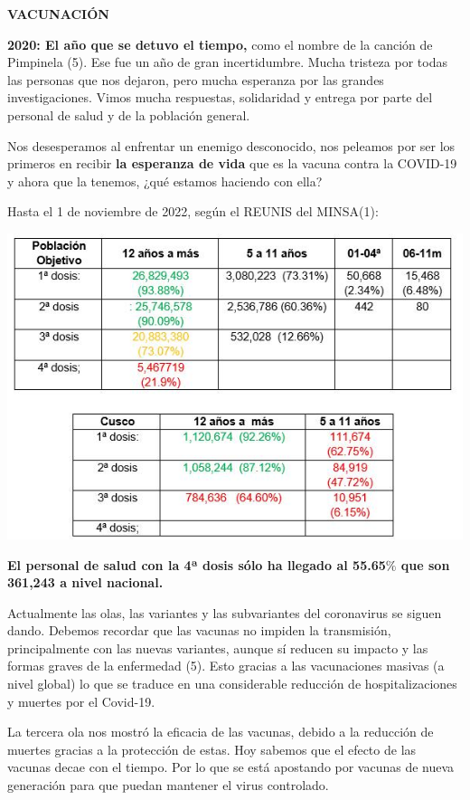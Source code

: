 \documentclass[12pt,a4paper,openany]{book}
\begin{document}
	\noindent \textbf{VACUNACIÓN}
		

\textbf{2020: El año que se detuvo el tiempo,} como el nombre de la canción de Pimpinela (5). Ese fue un año de gran incertidumbre. Mucha tristeza por todas las personas que nos dejaron, pero mucha esperanza por las grandes investigaciones. Vimos mucha respuestas, solidaridad y entrega por parte del personal de salud y de la población general. 

Nos desesperamos al enfrentar un enemigo desconocido, nos peleamos por ser los primeros en recibir \textbf{la esperanza de vida} que es la vacuna contra la COVID-19 y ahora que la tenemos, ¿qué estamos haciendo con ella?
 
Hasta el 1 de noviembre de 2022, según el REUNIS del MINSA(1): 

	\includegraphics[width=0.95\linewidth]{../editorial/cuadros_cruz}

 \textbf{El personal de salud con la 4ª dosis sólo ha llegado al 55.65$\%$ que son 361,243 a nivel nacional.}
 
 Actualmente las olas, las variantes y las subvariantes del coronavirus se siguen dando. Debemos recordar que las vacunas no impiden la transmisión, principalmente con las nuevas variantes, aunque sí reducen su impacto y las formas graves de la enfermedad (5). Esto gracias a las vacunaciones masivas (a nivel global) lo que se traduce en una considerable reducción de hospitalizaciones y muertes por el Covid-19.
 
 La tercera ola nos mostró la eficacia de las vacunas, debido a la reducción de muertes gracias a la protección de estas. Hoy sabemos que el efecto de las vacunas decae con el tiempo. Por lo que se está apostando por vacunas de nueva generación para que puedan mantener el virus controlado.
  
\end{document}
